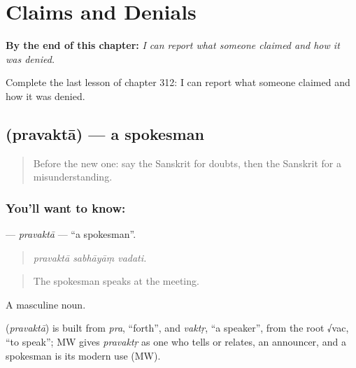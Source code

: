 
\chapter{Claims and Denials}
\label{ch:sa-claims-and-denials}

\begin{chapteropening}
\textbf{By the end of this chapter:} \emph{I can report what someone claimed and how it was denied.}

Complete the last lesson of chapter 312: I can report what someone claimed and how it was denied.
\end{chapteropening}

\section[\texorpdfstring{\sk{प्रवक्ता} (pravaktā)}{प्रवक्ता (pravaktā)}]{ (pravaktā) — a spokesman}

\label{lesson:SA-C312-pravakta}



\begin{quote}
Before the new one: say the Sanskrit for doubts, then the Sanskrit for a misunderstanding.
\end{quote}

\subsection*{You'll want to know: }
\textbf{} — \emph{pravaktā} — \textquotedblleft{}a spokesman\textquotedblright{}.

\begin{quote}
  
\end{quote}

\begin{quote}
\emph{pravaktā sabhāyāṃ vadati.}
\end{quote}

\begin{quote}
The spokesman speaks at the meeting.
\end{quote}

A masculine noun.

\begin{cousinweb}
\textbf{} (\emph{pravaktā}) is built from \emph{pra}, \textquotedblleft{}forth\textquotedblright{}, and \emph{vaktṛ}, \textquotedblleft{}a speaker\textquotedblright{}, from the root √vac, \textquotedblleft{}to speak\textquotedblright{}; MW gives \emph{pravaktṛ} as one who tells or relates, an announcer, and a spokesman is its modern use (MW).
\end{cousinweb}

